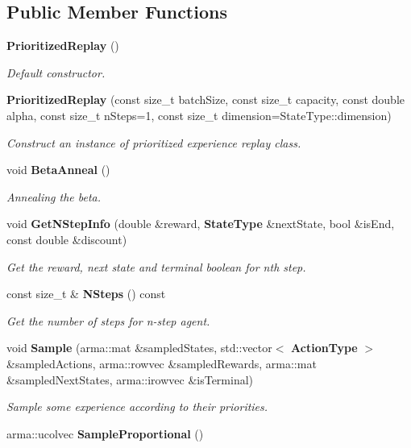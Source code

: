 \subsection*{Public Member Functions}
\begin{DoxyCompactItemize}
\item 
\textbf{ Prioritized\+Replay} ()
\begin{DoxyCompactList}\small\item\em Default constructor. \end{DoxyCompactList}\item 
\textbf{ Prioritized\+Replay} (const size\+\_\+t batch\+Size, const size\+\_\+t capacity, const double alpha, const size\+\_\+t n\+Steps=1, const size\+\_\+t dimension=State\+Type\+::dimension)
\begin{DoxyCompactList}\small\item\em Construct an instance of prioritized experience replay class. \end{DoxyCompactList}\item 
void \textbf{ Beta\+Anneal} ()
\begin{DoxyCompactList}\small\item\em Annealing the beta. \end{DoxyCompactList}\item 
void \textbf{ Get\+N\+Step\+Info} (double \&reward, \textbf{ State\+Type} \&next\+State, bool \&is\+End, const double \&discount)
\begin{DoxyCompactList}\small\item\em Get the reward, next state and terminal boolean for nth step. \end{DoxyCompactList}\item 
const size\+\_\+t \& \textbf{ N\+Steps} () const
\begin{DoxyCompactList}\small\item\em Get the number of steps for n-\/step agent. \end{DoxyCompactList}\item 
void \textbf{ Sample} (arma\+::mat \&sampled\+States, std\+::vector$<$ \textbf{ Action\+Type} $>$ \&sampled\+Actions, arma\+::rowvec \&sampled\+Rewards, arma\+::mat \&sampled\+Next\+States, arma\+::irowvec \&is\+Terminal)
\begin{DoxyCompactList}\small\item\em Sample some experience according to their priorities. \end{DoxyCompactList}\item 
arma\+::ucolvec \textbf{ Sample\+Proportional} ()

\end{DoxyCompactItemize}

